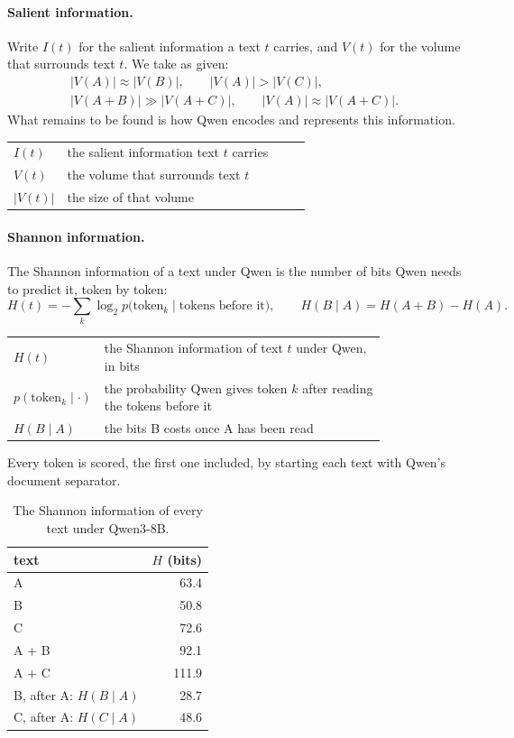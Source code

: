\documentclass[11pt]{article}
\makeatletter
\theoremstyle{remark}
\newenvironment{symbols}
  {\par\smallskip\noindent\small\begin{tabular}{@{}>{$}l<{$}@{\quad}p{0.82\linewidth}@{}}}
  {\end{tabular}\par\medskip}
\makeatother
\begin{document}
\paragraph{Salient information.} Write $I(t)$ for the salient information a text $t$ carries, and $V(t)$ for the volume that surrounds text $t$. We take as given:
\begin{equation}\label{eq:salient}
\begin{gathered}
|V(A)| \approx |V(B)|, \qquad |V(A)| > |V(C)|, \\
|V(A + B)| \gg |V(A + C)|, \qquad |V(A)| \approx |V(A + C)| .
\end{gathered}
\end{equation}
What remains to be found is how Qwen encodes and represents this information.
\begin{symbols}
I(t) & the salient information text $t$ carries \\
V(t) & the volume that surrounds text $t$ \\
|V(t)| & the size of that volume \\
\end{symbols}

\paragraph{Shannon information.} The Shannon information of a text under Qwen is the number of bits Qwen needs to predict it, token by token:
\begin{equation}
H(t) = -\sum_{k} \log_2 p\bigl(\text{token}_k \mid \text{tokens before it}\bigr), \qquad H(B \mid A) = H(A + B) - H(A) .
\end{equation}
\begin{symbols}
H(t) & the Shannon information of text $t$ under Qwen, in bits \\
p(\text{token}_k \mid \cdot) & the probability Qwen gives token $k$ after reading the tokens before it \\
H(B \mid A) & the bits B costs once A has been read \\
\end{symbols}
Every token is scored, the first one included, by starting each text with Qwen's document separator.

\begin{table}[ht]
\centering
\begin{tabular}{@{}lr@{}}
text & $H$ (bits) \\
\hline
A & 63.4 \\
B & 50.8 \\
C & 72.6 \\
A + B & 92.1 \\
A + C & 111.9 \\
B, after A: $H(B \mid A)$ & 28.7 \\
C, after A: $H(C \mid A)$ & 48.6 \\
\end{tabular}
\caption{The Shannon information of every text under Qwen3-8B.}
\label{tab:shannon}
\end{table}
\end{document}
